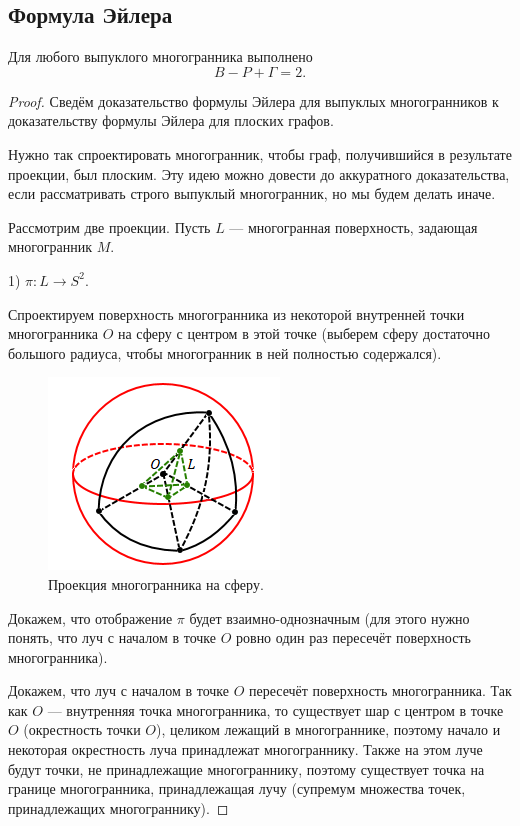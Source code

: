 \subsection{Формула Эйлера}
\begin{theorem}
    Для любого выпуклого многогранника выполнено \[B - P + \Gamma = 2.\]
\end{theorem}
\begin{proof}
    Сведём доказательство формулы Эйлера для выпуклых многогранников к доказательству формулы Эйлера для плоских графов.

    Нужно так спроектировать многогранник, чтобы граф, получившийся в результате проекции, был плоским. Эту идею можно довести до аккуратного доказательства, если рассматривать строго выпуклый многогранник, но мы будем делать иначе.

    Рассмотрим две проекции. Пусть $L$ — многогранная поверхность, задающая многогранник $M$.

    1) $\pi: L \to S^2$.

    Спроектируем поверхность многогранника из некоторой внутренней точки многогранника $O$ на сферу с центром в этой точке (выберем сферу достаточно большого радиуса, чтобы многогранник в ней полностью содержался).

    \begin{figure}[h]
        \centering
        \includegraphics[scale=0.8]{images/c7.2.png}
        \caption{Проекция многогранника на сферу.}
        \label{fig:c7.2}
    \end{figure}

    Докажем, что отображение $\pi$ будет взаимно-однозначным (для этого нужно понять, что луч с началом в точке $O$ ровно один раз пересечёт поверхность многогранника).

    Докажем, что луч с началом в точке $O$ пересечёт поверхность многогранника. Так как $O$ — внутренняя точка многогранника, то существует шар с центром в точке $O$ (окрестность точки $O$), целиком лежащий в многограннике, поэтому начало и некоторая окрестность луча принадлежат многограннику. Также на этом луче будут точки, не принадлежащие многограннику, поэтому существует точка на границе многогранника, принадлежащая лучу (супремум множества точек, принадлежащих многограннику).


\end{proof}
